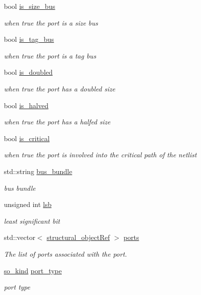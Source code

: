 \begin{DoxyCompactItemize}
bool \hyperlink{structport__o_a1846a14b34889a279fcda8e1cad5ee78}{is\+\_\+size\+\_\+bus}
\begin{DoxyCompactList}\small\item\em when true the port is a size bus \end{DoxyCompactList}\item 
bool \hyperlink{structport__o_a2668f6655348ed977814dd8a3da28ac0}{is\+\_\+tag\+\_\+bus}
\begin{DoxyCompactList}\small\item\em when true the port is a tag bus \end{DoxyCompactList}\item 
bool \hyperlink{structport__o_aa645689cd2edfdef7bf0ded1ca95ef3b}{is\+\_\+doubled}
\begin{DoxyCompactList}\small\item\em when true the port has a doubled size \end{DoxyCompactList}\item 
bool \hyperlink{structport__o_a4a808b723b089dd912e89c4db297f739}{is\+\_\+halved}
\begin{DoxyCompactList}\small\item\em when true the port has a halfed size \end{DoxyCompactList}\item 
bool \hyperlink{structport__o_a32d081be17055c0423a5a69df0c22d54}{is\+\_\+critical}
\begin{DoxyCompactList}\small\item\em when true the port is involved into the critical path of the netlist \end{DoxyCompactList}\item 
std\+::string \hyperlink{structport__o_ad5ea16ea5d4d94c5376c54f3065d5cbb}{bus\+\_\+bundle}
\begin{DoxyCompactList}\small\item\em bus bundle \end{DoxyCompactList}\item 
unsigned int \hyperlink{structport__o_afb3794f44682a764b7d9643a0956405f}{lsb}
\begin{DoxyCompactList}\small\item\em least significant bit \end{DoxyCompactList}\item 
std\+::vector$<$ \hyperlink{structural__objects_8hpp_a8ea5f8cc50ab8f4c31e2751074ff60b2}{structural\+\_\+object\+Ref} $>$ \hyperlink{structport__o_aaed01c24cd23370f2168c8b756630d8d}{ports}
\begin{DoxyCompactList}\small\item\em The list of ports associated with the port. \end{DoxyCompactList}\item 
\hyperlink{structural__objects_8hpp_acf52399aecacb7952e414c5746ce6439}{so\+\_\+kind} \hyperlink{structport__o_a46b110bb20ad95cd76f715b7777f8b01}{port\+\_\+type}
\begin{DoxyCompactList}\small\item\em port type \end{DoxyCompactList}\end{DoxyCompactItemize}
